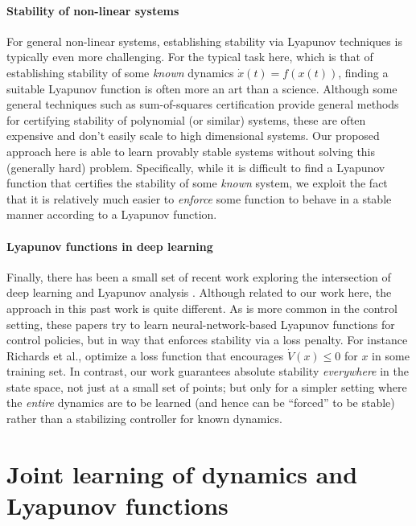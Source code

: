 \paragraph{Stability of non-linear systems}  For general non-linear systems, establishing stability via Lyapunov techniques is typically even more challenging.  For the typical task here, which is that of establishing stability of some \emph{known} dynamics $\dot{x}(t) = f(x(t))$, finding a suitable Lyapunov function is often more an art than a science.  Although some general techniques such as sum-of-squares certification \citep{parrilo2000structured,papachristodoulou2002construction} provide general methods for certifying stability of polynomial (or similar) systems, these are often expensive and don't easily scale to high dimensional systems.
Our proposed approach here is able to learn provably stable systems without solving this (generally hard) problem.  Specifically, while it is difficult to find a Lyapunov function that certifies the stability of some \emph{known} system, we exploit the fact that it is relatively much easier to \emph{enforce} some function to behave in a stable manner according to a Lyapunov function.

\paragraph{Lyapunov functions in deep learning}
Finally, there has been a small set of recent work exploring the intersection of deep learning and Lyapunov analysis \citep{chow2018lyapunov,richards2018lyapunov,taylor2019episodic}.  Although related to our work here, the approach in this past work is quite different.  As is more common in the control setting, these papers try to learn neural-network-based Lyapunov functions for control policies, but in way that enforces stability via a loss penalty.  For instance Richards et al., \citep{richards2018lyapunov} optimize a loss function that encourages $\dot{V}(x) \leq 0$ for $x$ in some training set.  In contrast, our work guarantees absolute stability \emph{everywhere} in the state space, not just at a small set of points; but only for a simpler setting where the \emph{entire} dynamics are to be learned (and hence can be ``forced'' to be stable) rather than a stabilizing controller for known dynamics.

\section{Joint learning of dynamics and Lyapunov functions}

